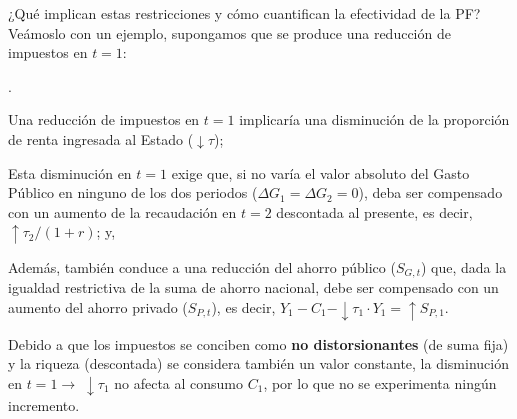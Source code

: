 \documentclass[10pt,a4paper]{article}
\newcounter{numitem}
\newenvironment{lnum}
      {\begin{list}{\arabic{numitem}.}{%
          \usecounter{numitem}%
          \setlength{\leftmargin}{1cm}%
          \setlength{\parskip}{3pt}%
          \setlength{\itemsep}{0pt}%
          \setlength{\parsep}{0pt}%
      }}
      {\end{list}}
\begin{document}
¿Qué implican estas restricciones y cómo cuantifican la efectividad de la PF? Veámoslo con un ejemplo, supongamos que se produce una reducción de impuestos en $t=1$:
\begin{lnum}
    \item Una reducción de impuestos en $t=1$ implicaría una disminución de la proporción de renta ingresada al Estado ($\downarrow \tau$);
    \item Esta disminución en $t=1$ exige que, si no varía el valor absoluto del Gasto Público en ninguno de los dos periodos ($\Delta G_1=\Delta G_2=0$), deba ser compensado con un aumento de la recaudación en $t=2$ descontada al presente, es decir, $\uparrow \tau_2/(1+r)$; y,
    \item Además, también conduce a una reducción del ahorro público ($S_{G,t}$) que, dada la igualdad restrictiva de la suma de ahorro nacional, debe ser compensado con un aumento del ahorro privado ($S_{P,t}$), es decir, $Y_1-C_1-\downarrow \tau_1\cdot Y_1=\uparrow S_{P,1}$.
\end{lnum}

Debido a que los impuestos se conciben como \textbf{no distorsionantes} (de suma fija) y la riqueza (descontada) se considera también un valor constante, la disminución en $t=1\longrightarrow\;\downarrow\tau_1$ no afecta al consumo $C_1$, por lo que no se experimenta ningún incremento. 
\end{document}
